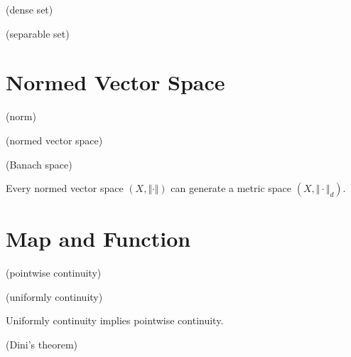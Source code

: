 \begin{definition}
(dense set)
\end{definition}

\begin{definition}
(separable set)
\end{definition}

\section{Normed Vector Space}

\begin{definition}
(norm)
\end{definition}

\begin{definition}
(normed vector space)
\end{definition}

\begin{definition}
(Banach space)
\end{definition}

\begin{theorem}
Every normed vector space $(X, \Vert\cdot\Vert)$ can generate a metric space $(X, \Vert\cdot\Vert_{d})$. 
\end{theorem}

\section{Map and Function}

\begin{definition}
(pointwise continuity)
\end{definition}

\begin{definition}
(uniformly continuity)
\end{definition}

\begin{theorem}
Uniformly continuity implies pointwise continuity. 
\end{theorem}

\begin{theorem}
(Dini's theorem)
\end{theorem}







